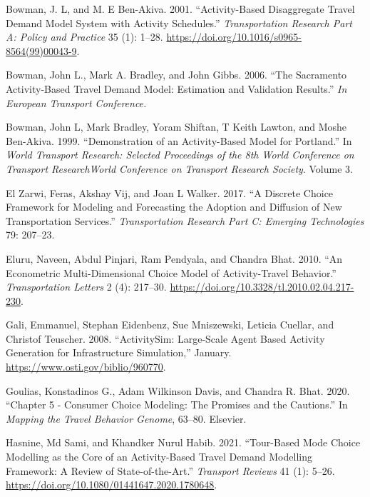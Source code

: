 \documentclass[12pt, oneside, openright]{byuthesis}
\newlength{\cslhangindent}
\newlength{\cslentryspacingunit} %
\newenvironment{CSLReferences}[2] %
 {%
  \setlength{\parindent}{0pt}
  \ifodd #1
  \let\oldpar\par
  \def\par{\hangindent=\cslhangindent\oldpar}
  \fi
  \setlength{\parskip}{#2\cslentryspacingunit}
 }%
 {}
\begin{document}
\begin{CSLReferences}{1}{0}
\leavevmode{}%
Bowman, J. L, and M. E Ben-Akiva. 2001. {``Activity-Based Disaggregate Travel Demand Model System with Activity Schedules.''} \emph{Transportation Research Part A: Policy and Practice} 35 (1): 1--28. \url{https://doi.org/10.1016/s0965-8564(99)00043-9}.

\leavevmode{}%
Bowman, John L., Mark A. Bradley, and John Gibbs. 2006. {``The Sacramento Activity-Based Travel Demand Model: Estimation and Validation Results.''} \emph{In European Transport Conference.}

\leavevmode{}%
Bowman, John L, Mark Bradley, Yoram Shiftan, T Keith Lawton, and Moshe Ben-Akiva. 1999. {``Demonstration of an Activity-Based Model for Portland.''} In \emph{World Transport Research: Selected Proceedings of the 8th World Conference on Transport ResearchWorld Conference on Transport Research Society}. Volume 3.

\leavevmode{}%
El Zarwi, Feras, Akshay Vij, and Joan L Walker. 2017. {``A Discrete Choice Framework for Modeling and Forecasting the Adoption and Diffusion of New Transportation Services.''} \emph{Transportation Research Part C: Emerging Technologies} 79: 207--23.

\leavevmode{}%
Eluru, Naveen, Abdul Pinjari, Ram Pendyala, and Chandra Bhat. 2010. {``An Econometric Multi-Dimensional Choice Model of Activity-Travel Behavior.''} \emph{Transportation Letters} 2 (4): 217--30. \url{https://doi.org/10.3328/tl.2010.02.04.217-230}.

\leavevmode{}%
Gali, Emmanuel, Stephan Eidenbenz, Sue Mniszewski, Leticia Cuellar, and Christof Teuscher. 2008. {``ActivitySim: Large-Scale Agent Based Activity Generation for Infrastructure Simulation,''} January. \url{https://www.osti.gov/biblio/960770}.

\leavevmode{}%
Goulias, Konstadinos G., Adam Wilkinson Davis, and Chandra R. Bhat. 2020. {``Chapter 5 - Consumer Choice Modeling: The Promises and the Cautions.''} In \emph{Mapping the Travel Behavior Genome}, 63--80. Elsevier.

\leavevmode{}%
Hasnine, Md Sami, and Khandker Nurul Habib. 2021. {``Tour-Based Mode Choice Modelling as the Core of an Activity-Based Travel Demand Modelling Framework: A Review of State-of-the-Art.''} \emph{Transport Reviews} 41 (1): 5--26. \url{https://doi.org/10.1080/01441647.2020.1780648}.


\end{CSLReferences}
\end{document}

